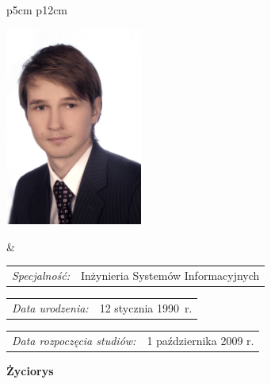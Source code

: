 \begin{titlepage}
    \newpage\thispagestyle{empty}
    \begin{tabular}{p{5cm} p{12cm}}
    \begin{minipage}{5cm}
    \center
    \includegraphics[height=6.5cm,width=4.5cm]{img/foto.jpg}
    \end{minipage}
    &
    \begin{minipage}{12cm}
    \begin{flushleft}
    \par\noindent\vspace{1\baselineskip}
    \begin{tabular}[h]{l l}
    {\normalsize\it Specjalność:} & \normalsize Inżynieria Systemów Informacyjnych 
    \end{tabular}
    \par\noindent\vspace{1\baselineskip}
    \begin{tabular}[h]{l l}
    {\normalsize\it Data urodzenia:} & {\normalsize 12 stycznia 1990~r.}
    \end{tabular}
    \par\noindent\vspace{1\baselineskip}
    \begin{tabular}[h]{l l}
    {\normalsize\it Data rozpoczęcia studiów:} & {\normalsize 1 października 2009 r.}
    \end{tabular}
    \par\noindent\vspace{1\baselineskip}
    \end{flushleft}
    \end{minipage}
    \end{tabular}
    \vspace*{1\baselineskip}
    \begin{center}
	{\large\bfseries Życiorys}\par\bigskip
    \end{center}


\end{titlepage}
